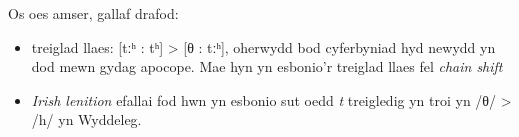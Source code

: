 Os oes amser, gallaf drafod:
\begin{itemize}
    \item  treiglad llaes: [tːʰ : tʰ] > [θ : tːʰ], oherwydd bod cyferbyniad hyd newydd yn dod mewn gydag apocope. Mae hyn yn esbonio'r treiglad llaes fel \textit{chain shift}
    \item \textit{Irish lenition} efallai fod hwn yn esbonio sut oedd \textit{t} treigledig yn troi yn /θ/ > /h/ yn Wyddeleg.
\end{itemize}







